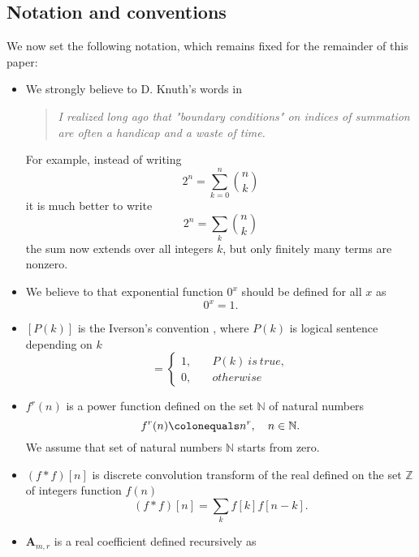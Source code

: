 \documentclass[12pt, letterpaper]{amsart}
\newenvironment{myitemize}
{ \begin{itemize}
    \setlength{\itemsep}{4pt}
    \setlength{\parskip}{4pt}
    \setlength{\parsep}{4pt}     }
{ \end{itemize}                  }
\theoremstyle{definition}
\theoremstyle{remark}
\numberwithin{equation}{section}
\begin{document}
\subsection{Notation and conventions}
We now set the following notation, which remains fixed for the remainder of this paper:
\begin{myitemize}
\item We strongly believe to D. Knuth's words in \cite{Knuth92}
\begin{quote}
\textit{I  realized long ago that "boundary conditions" on indices of summation are often a handicap and a waste of time.}
\end{quote}
For example, instead of writing
\begin{equation*}
2^n=\sum_{k=0}^n \binom{n}{k}
\end{equation*}
it is much better to write
\begin{equation*}
2^n=\sum_{k} \binom{n}{k}
\end{equation*}
the sum now extends over all integers $k$, but only finitely many terms are nonzero.
\item We believe to \cite{Grah94SN} that exponential function $0^x$ should be defined for all $x$  as
\begin{equation*}
0^x = 1.
\end{equation*}
\item $[P(k)]$ is the Iverson's convention \cite{APL}, where $P(k)$ is logical sentence depending on $k$
\begin{equation*}
[P(k)] =
\begin{cases}
1, &\quad P(k) \ is \ true, \\
0, &\quad otherwise
\end{cases}
\end{equation*}
\item $f^{r}(n)$ is a power function defined on the set $\mathbb{N}$ of natural numbers
\begin{equation*}
f^{r}(n) \colonequals n^r, \quad n\in\mathbb{N}.
\end{equation*}
We assume that set of natural numbers $\mathbb{N}$ starts from zero.
\item $(f\ast f)[n]$ is discrete convolution transform \cite{DiscConv} of the real defined on the set $\mathbb{Z}$ of integers function $f(n)$
\begin{equation*}
(f\ast f)[n]=\sum_{k}f[k]f[n-k].
\end{equation*}
\item $\mathbf{A}_{m,r}$ is a real coefficient defined recursively as

\end{myitemize}
\end{document}
